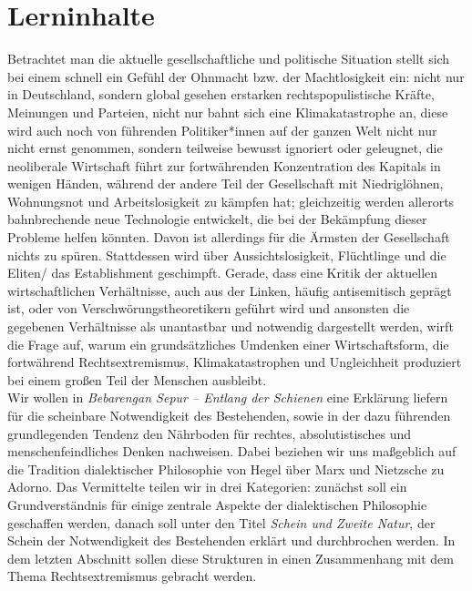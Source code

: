 \documentclass[12pt, a4paper, openany]{report}
\begin{document}
\chapter{Lerninhalte}
Betrachtet man die aktuelle gesellschaftliche und politische Situation stellt sich bei einem  schnell ein Gefühl der  Ohnmacht bzw. der Machtlosigkeit ein: nicht nur in Deutschland, sondern global gesehen erstarken rechtspopulistische Kräfte, Meinungen und Parteien, nicht nur bahnt sich eine Klimakatastrophe an, diese wird auch noch von führenden Politiker*innen auf der ganzen Welt nicht nur nicht ernst genommen, sondern teilweise bewusst ignoriert oder geleugnet, die neoliberale Wirtschaft führt zur fortwährenden Konzentration des Kapitals in wenigen Händen, während der andere Teil der Gesellschaft mit Niedriglöhnen, Wohnungsnot und Arbeitslosigkeit zu kämpfen hat; gleichzeitig werden allerorts bahnbrechende neue Technologie entwickelt, die bei der Bekämpfung dieser Probleme helfen könnten. 
Davon ist allerdings für die Ärmsten der Gesellschaft nichts zu spüren. Stattdessen wird über Aussichtslosigkeit, Flüchtlinge und die Eliten/ das Establishment geschimpft. Gerade, dass eine Kritik der aktuellen wirtschaftlichen Verhältnisse, auch aus der Linken, häufig antisemitisch geprägt ist, oder von Verschwörungstheoretikern geführt wird und ansonsten die gegebenen Verhältnisse als unantastbar und notwendig dargestellt werden, wirft die Frage auf, warum ein grundsätzliches Umdenken einer Wirtschaftsform, die fortwährend Rechtsextremismus, Klimakatastrophen und Ungleichheit produziert bei einem großen Teil der Menschen ausbleibt. \\
Wir wollen in \textit{Bebarengan Sepur – Entlang der Schienen} eine Erklärung liefern für die scheinbare Notwendigkeit des Bestehenden, sowie in der dazu führenden grundlegenden Tendenz den Nährboden für rechtes, absolutistisches und menschenfeindliches Denken nachweisen. 
Dabei beziehen wir uns maßgeblich auf die Tradition dialektischer Philosophie von Hegel über Marx und Nietzsche zu Adorno. 
Das Vermittelte teilen wir in drei Kategorien: zunächst soll ein Grundverständnis für einige zentrale Aspekte der dialektischen Philosophie geschaffen werden, danach soll unter den Titel \textit{Schein und Zweite Natur}, der Schein der Notwendigkeit des Bestehenden erklärt und durchbrochen werden. 
In dem letzten Abschnitt sollen diese Strukturen in einen Zusammenhang mit dem Thema Rechtsextremismus gebracht werden.
\end{document}
